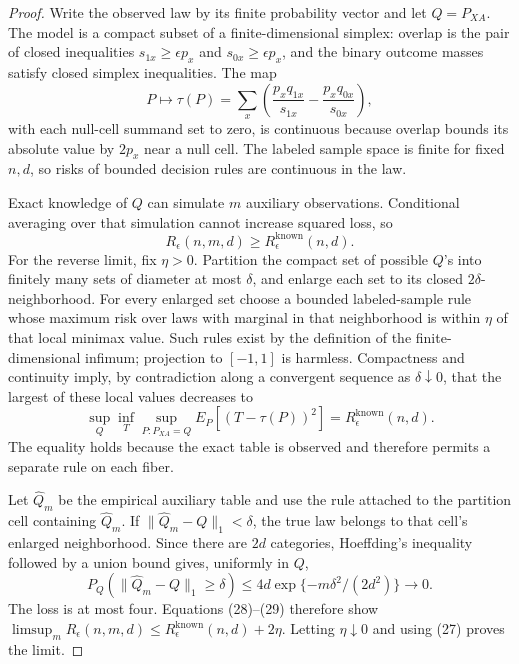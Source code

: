 \documentclass{article}
\begin{document}
\begin{proof}
Write the observed law by its finite probability vector and let \(Q=P_{XA}\).  The model is a compact subset of a finite-dimensional simplex: overlap is the pair of closed inequalities \(s_{1x}\ge\epsilon p_x\) and \(s_{0x}\ge\epsilon p_x\), and the binary outcome masses satisfy closed simplex inequalities.  The map
\[
 P\longmapsto\tau(P)=\sum_x\left(\frac{p_xq_{1x}}{s_{1x}}-\frac{p_xq_{0x}}{s_{0x}}\right),
\]
with each null-cell summand set to zero, is continuous because overlap bounds its absolute value by \(2p_x\) near a null cell.  The labeled sample space is finite for fixed \(n,d\), so risks of bounded decision rules are continuous in the law.

Exact knowledge of \(Q\) can simulate \(m\) auxiliary observations.  Conditional averaging over that simulation cannot increase squared loss, so
\[
 R_\epsilon(n,m,d)\ge R_\epsilon^{\mathrm{known}}(n,d). \tag{27}
\]
For the reverse limit, fix \(\eta>0\).  Partition the compact set of possible \(Q\)'s into finitely many sets of diameter at most \(\delta\), and enlarge each set to its closed \(2\delta\)-neighborhood.  For every enlarged set choose a bounded labeled-sample rule whose maximum risk over laws with marginal in that neighborhood is within \(\eta\) of that local minimax value.  Such rules exist by the definition of the finite-dimensional infimum; projection to \([-1,1]\) is harmless.  Compactness and continuity imply, by contradiction along a convergent sequence as \(\delta\downarrow0\), that the largest of these local values decreases to
\[
 \sup_Q\inf_T\sup_{P:P_{XA}=Q}E_P[(T-\tau(P))^2]
 =R_\epsilon^{\mathrm{known}}(n,d). \tag{28}
\]
The equality holds because the exact table is observed and therefore permits a separate rule on each fiber.

Let \(\widehat Q_m\) be the empirical auxiliary table and use the rule attached to the partition cell containing \(\widehat Q_m\).  If \(\|\widehat Q_m-Q\|_1<\delta\), the true law belongs to that cell's enlarged neighborhood.  Since there are \(2d\) categories, Hoeffding's inequality followed by a union bound gives, uniformly in \(Q\),
\[
 P_Q(\|\widehat Q_m-Q\|_1\ge\delta)
 \le4d\exp\{-m\delta^2/(2d^2)\}\longrightarrow0. \tag{29}
\]
The loss is at most four.  Equations (28)--(29) therefore show \(\limsup_mR_\epsilon(n,m,d)\le R_\epsilon^{\mathrm{known}}(n,d)+2\eta\).  Letting \(\eta\downarrow0\) and using (27) proves the limit.
\end{proof}
\end{document}
